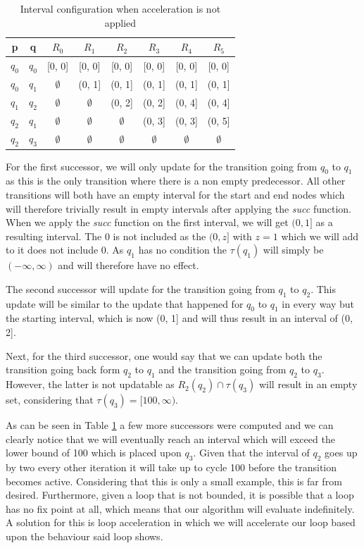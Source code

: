 \documentclass[12pt]{thesis}
\begin{document}
\begin{table}[h]
	\begin{tabular}{ |c|c|c|c|c|c|c|c| }
		\hline
		p		& q 	& $R_0$ 		& $R_1$			& $R_2$			& $R_3$			& $R_4$ 		& $R_5$ \\
		\hline
		$q_0$	& $q_0$ & [0, 0] 		& [0, 0] 		& [0, 0] 		& [0, 0]		& [0, 0]		& [0, 0] \\
		$q_0$	& $q_1$ & $\emptyset$ 	& (0, 1]		& (0, 1] 		& (0, 1]		& (0, 1] 		& (0, 1] \\
		$q_1$	& $q_2$ & $\emptyset$ 	& $\emptyset$ 	& (0, 2] 		& (0, 2]		& (0, 4] 		& (0, 4] \\
		$q_2$	& $q_1$ & $\emptyset$ 	& $\emptyset$ 	& $\emptyset$	& (0, 3]		& (0, 3] 		& (0, 5] \\
		$q_2$	& $q_3$ & $\emptyset$ 	& $\emptyset$ 	& $\emptyset$	& $\emptyset$	& $\emptyset$	& $\emptyset$ \\
		\hline
	\end{tabular}
	\centering
	\caption{Interval configuration when acceleration is not applied}
	\label{table:table_example_succ}
\end{table}

For the first successor, we will only update for the transition going from $q_0$ to $q_1$ as this is the only transition where there is a non empty predecessor. All other transitions will both have an empty interval for the start and end nodes which will therefore trivially result in empty intervals after applying the \textit{succ} function. When we apply the \textit{succ} function on the first interval, we will get $(0, 1]$ as a resulting interval. The 0 is not included as the $(0,z]$ with $z=1$ which we will add to it does not include 0. As $q_1$ has no condition the $\tau(q_1)$ will simply be $(-\infty, \infty)$ and will therefore have no effect.

The second successor will update for the transition going from $q_1$ to $q_2$. This update will be similar to the update that happened for $q_0$ to $q_1$ in every way but the starting interval, which is now (0, 1] and will thus result in an interval of (0, 2].

Next, for the third successor, one would say that we can update both the transition going back form $q_2$ to $q_1$ and the transition going from $q_2$ to $q_3$. However, the latter is not updatable as $R_2(q_2) \cap \tau(q_3)$ will result in an empty set, considering that $\tau(q_3) = [100, \infty)$.

As can be seen in Table \ref{table:table_example_succ} a few more successors were computed and we can clearly notice that we will eventually reach an interval which will exceed the lower bound of 100 which is placed upon $q_3$. Given that the interval of $q_2$ goes up by two every other iteration it will take up to cycle 100 before the transition becomes active. Considering that this is only a small example, this is far from desired. Furthermore, given a loop that is not bounded, it is possible that a loop has no fix point at all, which means that our algorithm will evaluate indefinitely. A solution for this is loop acceleration in which we will accelerate our loop based upon the behaviour said loop shows. 
\end{document}
